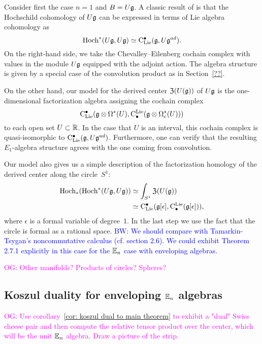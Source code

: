 \documentclass[11pt]{amsart}
\numberwithin{equation}{section}
\def\brian{\textcolor{blue}{BW: }\textcolor{blue}}
\def\owen{\textcolor{magenta}{OG: }\textcolor{magenta}}
\begin{document}
Consider first the case $n=1$ and $B = U \mathfrak g$. 
A classic result of \cite{HochSerre} is that the Hochschild cohomology of $U \mathfrak g$ can be expressed in terms of Lie algebra cohomology as 
\[
{\rm Hoch}^*(U\mathfrak g,U\mathfrak g) \simeq {\rm C}_{\rm Lie}^\bullet(\mathfrak g, U\mathfrak g^{ad}).
\] 
On the right-hand side, we take the Chevalley--Eilenberg cochain complex with values in the module $U \mathfrak g$ equipped with the adjoint action.
The algebra structure is given by a special case of the convolution product as in Section~\ref{??}. 

On the other hand, our model for the derived center ${\frak Z}(U(\mathfrak g))$ of $U \mathfrak g$ is the one-dimensional factorization algebra assigning the cochain complex
\[
{\rm C}_{\rm Lie}^\bullet(\mathfrak g \otimes \Omega^*(U), {\rm C}^{\rm Lie}_\bullet( \mathfrak g \otimes \Omega^*_c(U)))
\]
to each open set $U \subset \mathbb R$.
In the case that $U$ is an interval, this cochain complex is quasi-isomorphic to ${\rm C}_{\rm Lie}^\bullet (\mathfrak g , U\mathfrak g^{ad})$.
Furthermore, one can verify that the resulting $E_1$-algebra structure agrees with the one coming from convolution. 

Our model also gives us a simple description of the factorization homology of the derived center along the circle~$S^1$:
\begin{align*}
{\rm Hoch}_*({\rm Hoch}^*(U \mathfrak g, U\mathfrak g)) 
&\simeq \int_{S^1} {\frak Z}(U(\mathfrak g)) \\
&\simeq {\rm C}_{\rm Lie}^\bullet(\mathfrak g[\epsilon], {\rm C}^{\rm Lie}_\bullet( \mathfrak g[\epsilon])),
\end{align*}
where $\epsilon$ is a formal variable of degree~$1$. 
In the last step we use the fact that the circle is formal as a rational space.
\brian{We should compare with Tamarkin-Tsygan's noncommutative calculus (cf. section 2.6).
We could exhibit Theorem 2.7.1 explicitly in this case for the $\mathbb E_n$ case with enveloping algebras.}

\owen{Other manifolds? Products of circles? Spheres?}

\subsection{Koszul duality for enveloping $\mathbb E_n$ algebras}

\owen{Use corollary~\ref{cor: koszul dual to main theorem} to exhibit a "dual" Swiss cheese pair and then compute the relative tensor product over the center, which will be the unit $\mathbb E_n$ algebra. Draw a picture of the strip.}
\end{document}
